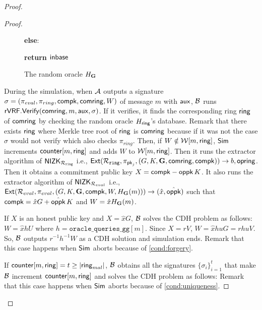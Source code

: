 \begin{proof}
\begin{proof}
\begin{figure}
{{						
						
						
						\textbf{else}:
						
						
						
						\textbf{return $ {\mathsf{inbase}}$}
						
				}}	
				\caption{The random oracle $ H_{\mathbf{G}} $}
				\label{oracle:HgbyB}
			\end{figure}

			
			During the simulation, when $ \mathcal{A} $ outputs a signature $ \sigma = (\pi_{eval},\pi_{ring},\mathsf{compk},\mathsf{comring},W) $ of message $ m $ with $ \mathsf{aux} $, $ \mathcal{B} $ runs $ {\mathsf{rVRF}}.{\mathsf{Verify}}(\mathsf{comring},m, \mathsf{aux}, \sigma) $. If it verifies, it finds the corresponding ring $ \mathsf{ring} $ of $ \mathsf{comring} $ by checking the random oracle $ H_\mathsf{ring} $'s database. Remark that there exists $ \mathsf{ring} $ where Merkle tree root of $ \mathsf{ring} $ is $ \mathsf{comring} $ because if it was not the case $ \sigma $ would not verify which also checks  $ \pi_{ring} $. Then, if  $ W \notin \mathcal{W}[m, \mathsf{ring}] $, $ \mathsf{Sim} $ increments  $ \mathsf{counter}[m,\mathsf{ring}] $ and adds $ W $ to $ \mathcal{W}[m,\mathsf{ring}] $.
			Then it runs the extractor algorithm of $ {\mathsf{NIZK}}_{\mathcal{R}_{\mathtt{ring}}} $ i.e., $ \mathsf{Ext}(\mathcal{R}_{\mathtt{ring}},\pi_{\mathsf{pk}_j},(G,K,{\mathbf{G}},\mathsf{comring}, \mathsf{compk}) ) \rightarrow b, \mathsf{opring}$. Then it obtains a commitment public key $ X = \mathsf{compk}  - \mathsf{oppk} \, K $. It also runs 	the extractor algorithm of $ {\mathsf{NIZK}}_{\mathcal{R}_{eval}} $ i.e., $ \mathsf{Ext}(\mathcal{R}_{eval},\pi_{eval},(G,K,{\mathbf{G}}, \mathsf{compk},W,H_{\mathbf{G}}(m))) \rightarrow (\hat{x},\hat{\mathsf{oppk}} )$ such that $ \mathsf{compk} = \hat{x}G + \hat{\mathsf{oppk}} \, K $ and $ W = \hat{x} H_{\mathbf{G}}(m) $. 
			
			If $ X  $ is an honest public key and $ X = \hat{x}G $, $ \mathcal{B} $ solves the CDH problem as follows: $ W = \hat{x} h U $ where $ h = \mathtt{oracle\_queries\_gg}[m] $. Since $ X = r V $, $ W = \hat{x}huG =rhuV $. So, $ \mathcal{B} $ outputs $ r^{-1}h^{-1}W $ as a CDH solution and simulation ends. Remark that this case happens when $ \mathsf{Sim} $ aborts because of \ref{cond:forgery}.
			
			If $  \mathsf{counter}[m,\mathsf{ring}] = t \geq |\mathsf{ring}_{mal}| $, $ \mathcal{B} $ obtains all the signatures $ \{\sigma_i\}_{i =1}^t $ that make $ \mathcal{B} $ increment $ \mathsf{counter}[m,\mathsf{ring}] $ and solves the CDH problem as follows: Remark that this case happens when $ \mathsf{Sim} $ aborts because of \ref{cond:uniqueness}.
			

\end{proof}
\end{proof}
